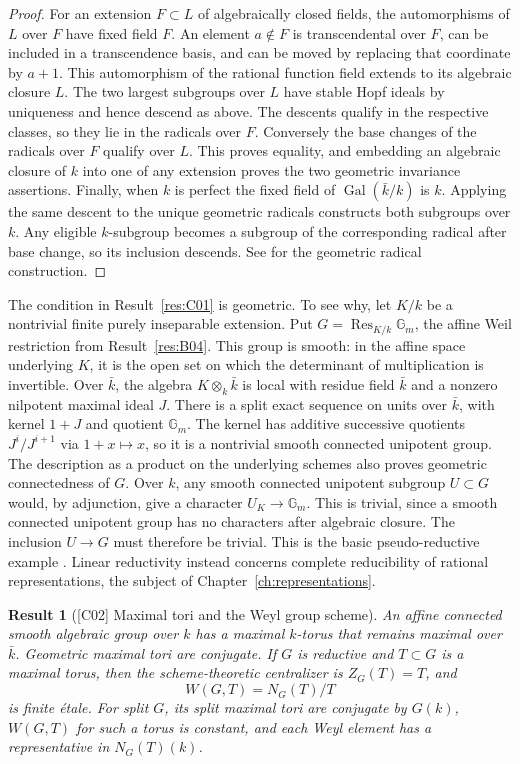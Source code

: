 \documentclass[11pt,a4paper,openany,oneside]{book}
\theoremstyle{resultstyle}
\newtheorem{statement}{Result}[chapter]
\newenvironment{result}[2]{\clubpenalty=10000\begin{statement}[\textnormal{[#1]} #2]\leavevmode\label{res:#1}\ignorespaces}{\end{statement}}
\theoremstyle{definition}
\numberwithin{equation}{chapter}
\newcommand{\Gm}{\mathbb{G}_m}
\DeclareMathOperator{\Res}{Res}
\begin{document}
\begin{proof}
For an extension \(F\subset L\) of algebraically closed fields,
the automorphisms of \(L\) over \(F\) have fixed field \(F\).
An element \(a\notin F\) is transcendental over \(F\), can be
included in a transcendence basis, and can be moved by replacing
that coordinate by \(a+1\). This automorphism of the rational
function field extends to its algebraic closure \(L\). The two
largest subgroups over \(L\) have stable Hopf ideals by uniqueness
and hence descend as above. The descents qualify in the respective
classes, so they lie in the radicals over \(F\). Conversely the base
changes of the radicals over \(F\) qualify over \(L\). This proves
equality, and embedding an algebraic closure of \(k\) into one of
any extension proves the two geometric invariance assertions.
Finally, when \(k\) is perfect the fixed field of
\(\operatorname{Gal}(\bar k/k)\) is \(k\). Applying the same descent
to the unique geometric radicals constructs both subgroups over
\(k\). Any eligible \(k\)-subgroup becomes a subgroup of the
corresponding radical after base change, so its inclusion descends.
See \cite[Chapter 19]{milne} for the geometric radical construction.
\end{proof}

The condition in Result~\ref{res:C01} is geometric. To see why, let \(K/k\) be a nontrivial finite purely inseparable extension. Put \(G=\Res_{K/k}\Gm\), the affine Weil restriction from Result~\ref{res:B04}. This group is smooth: in the affine space underlying \(K\), it is the open set on which the determinant of multiplication is invertible. Over \(\bar k\), the algebra \(K\otimes_k\bar k\) is local with residue field \(\bar k\) and a nonzero nilpotent maximal ideal \(J\). There is a split exact sequence on units over \(\bar k\), with kernel \(1+J\) and quotient \(\Gm\). The kernel has additive successive quotients \(J^i/J^{i+1}\) via \(1+x\mapsto x\), so it is a nontrivial smooth connected unipotent group. The description as a product on the underlying schemes also proves geometric connectedness of \(G\). Over \(k\), any smooth connected unipotent subgroup \(U\subset G\) would, by adjunction, give a character \(U_K\to\Gm\). This is trivial, since a smooth connected unipotent group has no characters after algebraic closure. The inclusion \(U\to G\) must therefore be trivial. This is the basic pseudo-reductive example \cite[Example 1.1.3]{cgp}. Linear reductivity instead concerns complete reducibility of rational representations, the subject of Chapter~\ref{ch:representations}.

\begin{result}{C02}{Maximal tori and the Weyl group scheme}
An affine connected smooth algebraic group over \(k\) has a maximal \(k\)-torus that remains maximal over \(\bar k\). Geometric maximal tori are conjugate. If \(G\) is reductive and \(T\subset G\) is a maximal torus, then the scheme-theoretic centralizer is \(Z_G(T)=T\), and
\[
  W(G,T)=N_G(T)/T
\]
is finite \'etale. For split \(G\), its split maximal tori are conjugate by \(G(k)\), \(W(G,T)\) for such a torus is constant, and each Weyl element has a representative in \(N_G(T)(k)\).
\end{result}
\end{document}
